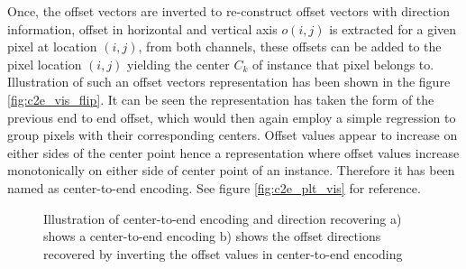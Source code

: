 Once,  the offset vectors are inverted to re-construct offset vectors with direction information,  offset  in  horizontal  and  vertical  axis $o(i,j)$  is  extracted  for  a  given  pixel  at location $(i,j)$, from both channels, these offsets can be added to the pixel location $(i,j)$ yielding the center $C_{k}$ of instance that pixel belongs to. Illustration of such an offset vectors representation has been shown in the figure \ref{fig:c2e_vis_flip}. It can be seen the representation has taken the form of the previous end to end offset, which would then again employ a simple regression to group pixels with their corresponding centers.
Offset values appear to increase on either sides of the center point hence a representation where offset values increase monotonically on either side of center point of an instance. Therefore  it has  been named as center-to-end encoding. See figure \ref{fig:c2e_plt_vis} for reference.


\begin{figure}[!ht]
        
        \caption[Center to End Encoding with Direction Recovering] {Illustration of center-to-end encoding and direction recovering a) shows a center-to-end encoding b) shows the offset directions recovered by inverting the offset values in center-to-end encoding}
        \label{fig:c2e_vis_pixels}
\end{figure}



